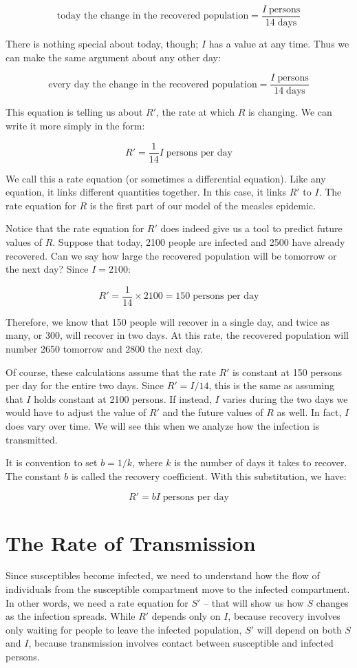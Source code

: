 \documentclass
[justified,nohyper]
{tufte-handout}
\begin{document}
\[
	\text{today the change in the recovered population} = \dfrac{I\;\text{persons}}{14\;\text{days}}
\]

There is nothing special about today, though; $I$ has a value at any time. Thus 
we can make the same argument about any other day:

\[
	\text{every day the change in the recovered population} = \dfrac{I\;\text{persons}}{14\;\text{days}}
\]

This equation is telling us about $R'$, the rate at which $R$ is changing. We can 
write it more simply in the form:

\[
	R' = \dfrac{1}{14}I \; \text{persons per day}
\]

We call this a rate equation (or sometimes a differential equation). Like any 
equation, it links different quantities together. In this case, it links $R'$ to $
I$. The rate equation for $R$ is the first part of our model of the measles 
epidemic.

Notice that the rate equation for $R'$ does indeed give us a tool to predict 
future values of $R$. Suppose that today, 2100 people are infected and 2500 have 
already recovered. Can we say how large the recovered population will be tomorrow 
or the next day? Since $I=2100$:

\[
	R' = \dfrac{1}{14} \times 2100 = 150\;\text{persons per day}
\]

Therefore, we know that 150 people will recover in a single day, and twice as 
many, or 300, will recover in two days. At this rate, the recovered population 
will number 2650 tomorrow and 2800 the next day.

Of course, these calculations assume that the rate $R'$ is constant at 150 
persons per day for the entire two days. Since $R'=I/14$, this is the same as 
assuming that $I$ holds constant at 2100 persons. If instead, $I$ varies during 
the two days we would have to adjust the value of $R'$ and the future values of $R
$ as well. In fact, $I$ does vary over time. We will see this when we analyze how 
the infection is transmitted.

It is convention to set $b=1/k$, where $k$ is the number of days it takes to 
recover. The constant $b$ is called the recovery coefficient. With this 
substitution, we have:

\[
	R' = bI\;\text{persons per day}
\]

\section{The Rate of Transmission}
Since susceptibles become infected, we need to understand how the flow of individuals from the susceptible compartment move to the infected compartment. In other words, we need a rate equation for $S'$ -- that will show us how $S$ changes as the infection spreads. While $R'$ depends only on $I$, because recovery involves only waiting for people to leave the infected population, $S'$ will depend on both $S$ and $I$, because transmission involves contact between susceptible and infected persons.
\end{document}
